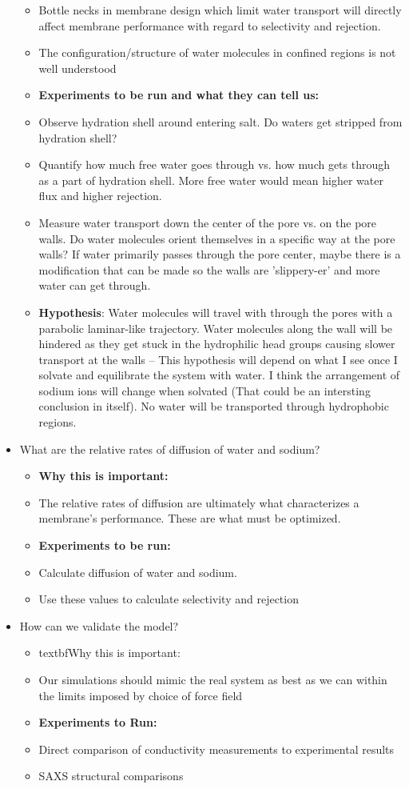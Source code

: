 \documentclass{article}
\begin{document}
\begin{itemize}
\begin{itemize}
			\item Bottle necks in membrane design which limit water transport will directly affect membrane performance with regard to selectivity and rejection. 
			\item The configuration/structure of water molecules in confined regions is not well understood
			\item \textbf{Experiments to be run and what they can tell us:}
			\item Observe hydration shell around entering salt. Do waters get stripped from hydration shell?
			\item Quantify how much free water goes through vs. how much gets through as a part of hydration shell. More free water would mean higher water flux and higher rejection. 
			\item Measure water transport down the center of the pore vs. on the pore walls. Do water molecules orient themselves in a specific way at the pore walls? If water primarily passes through the pore center, maybe there is a modification that can be made so the walls are 'slippery-er' and more water can get through. 
			\item \textbf{Hypothesis}: Water molecules will travel with through the pores with a parabolic laminar-like trajectory. Water molecules along the wall will be hindered as they get stuck in the hydrophilic head groups causing slower transport at the walls -- This hypothesis will depend on what I see once I solvate and equilibrate the system with water. I think the arrangement of sodium ions will change when solvated (That could be an intersting conclusion in itself). No water will be transported through hydrophobic regions.    
		\end{itemize}
		\item What are the relative rates of diffusion of water and sodium? 
		\begin{itemize}
			\item \textbf{Why this is important:}
			\item The relative rates of diffusion are ultimately what characterizes a membrane's performance. These are what must be optimized.
			\item \textbf{Experiments to be run:}
			\item Calculate diffusion of water and sodium. 
			\item Use these values to calculate selectivity and rejection
		\end{itemize}
		\item How can we validate the model?
		\begin{itemize}
			\item textbf{Why this is important:}
			\item Our simulations should mimic the real system as best as we can within the limits imposed by choice of force field
			\item \textbf{Experiments to Run:}
			\item Direct comparison of conductivity measurements to experimental results
			\item SAXS structural comparisons
		\end{itemize} 
	\end{itemize}
\end{document}
